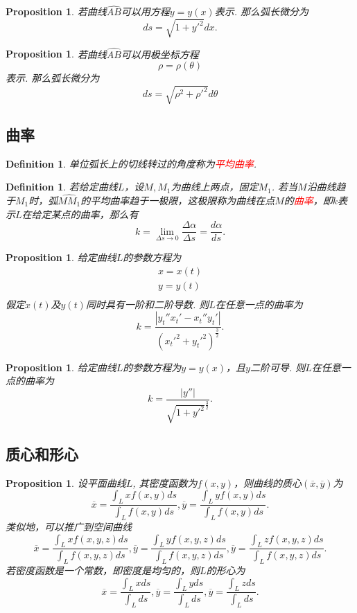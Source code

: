 \documentclass{article}
\newtheorem{proposition}[theorem]{Proposition}
\newtheorem{definition}[theorem]{Definition}
\newcommand{\redt}[1]{\textcolor{red}{#1}}
\begin{document}
\begin{proposition}
\rm  若曲线$\widehat{AB}$可以用方程$y=y(x)$表示. 那么弧长微分为
$$
ds = \sqrt{1+y'^2} dx. 
$$
\end{proposition}

\begin{proposition}
\rm 若曲线$\widehat{AB}$可以用极坐标方程
$$
\rho = \rho(\theta)
$$
表示. 那么弧长微分为
$$
ds = \sqrt{\rho^2+\rho'^2}d\theta
$$
\end{proposition}

\subsection{曲率}

\begin{definition}
\rm 单位弧长上的切线转过的角度称为\redt{平均曲率}. 
\end{definition}

\begin{definition}
\rm 若给定曲线$L$，设$M,M_1$为曲线上两点，固定$M_1$. 若当$M$沿曲线趋于$M_1$时，弧$\widehat{MM_1}$的平均曲率趋于一极限，这极限称为曲线在点$M$的\redt{曲率}，即$k$表示$L$在给定某点的曲率，那么有
$$
k =  \lim\limits_{\Delta s \to 0} \frac{\Delta \alpha}{\Delta s} = \frac{d\alpha}{ds}.
$$ 
\end{definition}

\begin{proposition}
\rm 给定曲线$L$的参数方程为
$$
\begin{array}{ll}
x = x(t) \\
y = y(t) \\
\end{array}
$$
假定$x(t)$及$y(t)$同时具有一阶和二阶导数. 则$L$在任意一点的曲率为
$$
k = \frac{|y_t''x_t'-x_t''y_t'|}{(x_t'^2 + y_t'^2)^{\frac{3}{2}}}.
$$
\end{proposition}

\begin{proposition}
\rm 给定曲线$L$的参数方程为$y=y(x)$，且$y$二阶可导. 则$L$在任意一点的曲率为
$$
k = \frac{|y''|}{\sqrt{1+y'^2}^{\frac{3}{2}}}.
$$
\end{proposition}


\subsection{质心和形心}

\begin{proposition}
\rm 设平面曲线$L$, 其密度函数为$f(x,y)$，则曲线的质心$(\overline{x},\overline{y})$为
$$
\overline{x} = \frac{\int_L xf(x,y)ds}{\int_L f(x,y)ds}, \overline{y} = \frac{\int_L yf(x,y)ds}{\int_L f(x,y)ds}.
$$
类似地，可以推广到空间曲线
$$
\overline{x} = \frac{\int_L xf(x,y,z)ds}{\int_L f(x,y,z)ds}, \overline{y} = \frac{\int_L yf(x,y,z)ds}{\int_L f(x,y,z)ds},
\overline{y} = \frac{\int_L zf(x,y,z)ds}{\int_L f(x,y,z)ds}.
$$
若密度函数是一个常数，即密度是均匀的，则$L$的形心为
$$
\overline{x} = \frac{\int_L xds}{\int_L ds}, \overline{y} = \frac{\int_L yds}{\int_L ds},
\overline{y} = \frac{\int_L zds}{\int_L ds}.
$$
\end{proposition}
\end{document}
